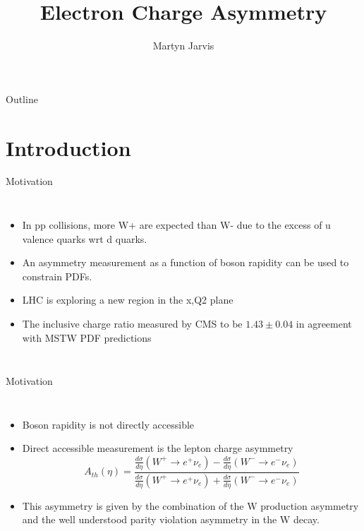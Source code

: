\documentclass[t, 8pt]{beamer}
\author{Martyn Jarvis}
\title[Electron Charge Asymmetry]{Electron Charge Asymmetry}
\begin{document}
\begin{frame}
  \titlepage
\end{frame}

\begin{frame}{Outline}
  \tableofcontents
\end{frame}

\section{Introduction}

\begin{frame}{Motivation}
  \begin{columns}[c]
  \begin{itemize}
    \item In pp collisions, more W+ are expected than W- due to the excess of u valence quarks wrt d quarks.
    \item An asymmetry measurement as a function of boson rapidity can be used to constrain PDFs.
    \item LHC is exploring a new region in the x,Q2 plane
    \item The inclusive charge ratio measured by CMS to be $1.43 \pm 0.04$ in agreement with MSTW PDF predictions
  \end{itemize}
  \end{columns}
\end{frame}

\begin{frame}{Motivation}
  \begin{columns}[c]
  \begin{itemize}
    \item Boson rapidity is not directly accessible
    \item Direct accessible measurement is the lepton charge asymmetry
    \begin{equation}
    A_{th}(\eta) = \frac{\frac{d\sigma}{d\eta}(W^{+}\to e^{+}\nu_{e}) - \frac{d\sigma}{d\eta}(W^{-}\to e^{-}\nu_{e})}
                        {\frac{d\sigma}{d\eta}(W^{+}\to e^{+}\nu_{e}) + \frac{d\sigma}{d\eta}(W^{-}\to e^{-}\nu_{e})}
    \end{equation}
    \item This asymmetry is given by the combination of the W production asymmetry and the well understood parity violation asymmetry in the W decay.
  \end{itemize}
  \end{columns}
\end{frame}
\end{document}
